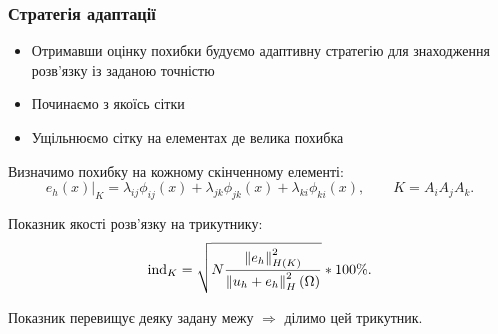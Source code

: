 
\newcommand{\error}[1]{\lambda_{#1} \phi_{#1}(x)}

\begin{frame}[allowframebreaks]
	\frametitle<presentation>{Стратегія адаптації}

	\begin{itemize}
		\item Отримавши оцінку похибки будуємо адаптивну стратегію для знаходження розв'язку із заданою точністю
		\item Починаємо з якоїсь сітки
		\item Ущільнюємо сітку на елементах де велика похибка
	\end{itemize}

	\framebreak

	Визначимо похибку на кожному скінченному елементі:
	\begin{equation}\label{eq:error_element}
		e_h(x)\bigg|_K = \error{ij}+\error{jk}+\error{ki}, \qquad K = A_iA_jA_k.
	\end{equation}

	Показник якості розв'язку на трикутнику:
	\begin{equation}\label{eq:error_indicator}
		\text{ind}_K = \sqrt{N \frac
				{\left\lVert e_h\right\rVert^2_{H(K)}}
				{\left\lVert u_h+e_h\right\rVert^2_H(\Omega)}
		}*100\%.
	\end{equation}

	Показник перевищує деяку задану межу $\Rightarrow$ ділимо цей трикутник.
\end{frame}

\undeff{\error}
